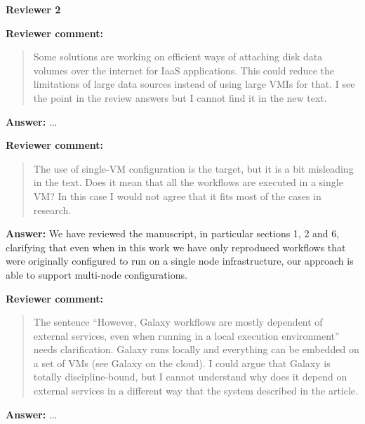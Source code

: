 \documentclass{letter}
\newenvironment{review}%
{\textbf{Reviewer comment:}\begin{quote}}%
{\end{quote}}%
\newcommand{\answer}[1]{%
      \textbf{Answer:} #1}
\newcommand{\revised}[1]{\emph{#1}\color{black}}
\begin{document}
\begin{letter}{}







\newpage

%
%
\textbf{Reviewer 2}


\begin{review}
Some solutions are working on efficient ways of attaching disk data volumes over the internet for IaaS applications. This could reduce the limitations of large data sources instead of using large VMIs for that. I see the point in the review answers but I cannot find it in the new text.
\end{review}

\answer{...}

\begin{review}
The use of single-VM configuration is the target, but it is a bit misleading in the text. Does it mean that all the workflows are executed in a single VM? In this case I would not agree that it fits most of the cases in research.
\end{review}

\answer{We have reviewed the manuscript, in particular sections 1, 2 and 6, clarifying that even when in this work we have only reproduced workflows that were originally configured to run on a single node infrastructure, our approach is able to support multi-node configurations.}

\begin{review}
The sentence ``However, Galaxy workflows are mostly dependent of external services, even when running in a local execution environment'' needs clarification. Galaxy runs locally and everything can be embedded on a set of VMs (see Galaxy on the cloud). I could argue that Galaxy is totally discipline-bound, but I cannot understand why does it depend on external services in a different way that the system described in the article.
\end{review}

\answer{...}

\revised{}




\end{letter}
\end{document}
